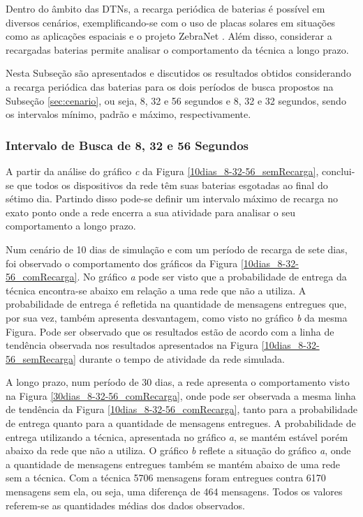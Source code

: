 Dentro do âmbito das DTNs, a recarga periódica de baterias é possível em diversos cenários, exemplificando-se com o uso de placas solares em situações como as aplicações espaciais e o projeto ZebraNet \cite{zhang2004hardware}. Além disso, considerar a recargadas baterias permite analisar o comportamento da técnica a longo prazo.

Nesta Subseção são apresentados e discutidos os resultados obtidos considerando a recarga periódica das baterias para os dois períodos de busca propostos na Subseção \ref{sec:cenario}, ou seja, 8, 32 e 56 segundos e 8, 32 e 32 segundos, sendo os intervalos mínimo, padrão e máximo, respectivamente.

\subsubsection{Intervalo de Busca de 8, 32 e 56 Segundos}
\label{8-32-56_comRecarga}

A partir da análise do gráfico \emph{c} da Figura \ref{10dias_8-32-56_semRecarga}, conclui-se que todos os dispositivos da rede têm suas baterias esgotadas ao final do sétimo dia. Partindo disso pode-se definir um intervalo máximo de recarga no exato ponto onde a rede encerra a sua atividade para analisar o seu comportamento a longo prazo.

Num cenário de 10 dias de simulação e com um período de recarga de sete dias, foi observado o comportamento dos gráficos da Figura \ref{10dias_8-32-56_comRecarga}. No gráfico \emph{a} pode ser visto que a probabilidade de entrega da técnica encontra-se abaixo em relação a uma rede que não a utiliza. A probabilidade de entrega é refletida na quantidade de mensagens entregues que, por sua vez, também apresenta desvantagem, como visto no gráfico \emph{b} da mesma Figura. Pode ser observado que os resultados estão de acordo com a linha de tendência observada nos resultados apresentados na Figura \ref{10dias_8-32-56_semRecarga} durante o tempo de atividade da rede simulada.

A longo prazo, num período de 30 dias, a rede apresenta o comportamento visto na Figura \ref{30dias_8-32-56_comRecarga}, onde pode ser observada a mesma linha de tendência da Figura \ref{10dias_8-32-56_comRecarga}, tanto para a probabilidade de entrega quanto para a quantidade de mensagens entregues. A probabilidade de entrega utilizando a técnica, apresentada no gráfico \emph{a}, se mantém estável porém abaixo da rede que não a utiliza. O gráfico \emph{b} reflete a situação do gráfico \emph{a}, onde a quantidade de mensagens entregues também se mantém abaixo de uma rede sem a técnica. Com a técnica 5706 mensagens foram entregues contra 6170 mensagens sem ela, ou seja, uma diferença de 464 mensagens. Todos os valores referem-se as quantidades médias dos dados observados.

